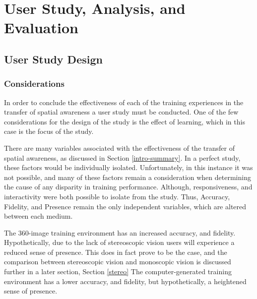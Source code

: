 \documentclass[ %
                    author={Elis Jones},
                supervisor={Dr. Kirsten Cater},
                    degree={BSc},
                     title={The Effect of Presentation Medium on Spatial Cognition},
                  subtitle={in the Virtual Environment},
                      year={2018} ]{dissertation}
\begin{document}
\chapter{User Study, Analysis, and Evaluation}\label{user-study-chapter}

\section{User Study Design}

\subsection{Considerations}
In order to conclude the effectiveness of each of the training experiences in the transfer of spatial awareness a user study must be conducted. One of the few considerations for the design of the study is the effect of learning, which in this case is the focus of the study.

There are many variables associated with the effectiveness of the transfer of spatial awareness, as discussed in Section \ref{intro-summary}. In a perfect study, these factors would be individually isolated. Unfortunately, in this instance it was not possible, and many of these factors remain a consideration when determining the cause of any disparity in training performance. Although, responsiveness, and interactivity were both possible to isolate from the study. Thus, Accuracy, Fidelity, and Presence remain the only independent variables, which are altered between each medium. 

The 360-image training environment has an increased accuracy, and fidelity. Hypothetically, due to the lack of stereoscopic vision users will experience a reduced sense of presence. This does in fact prove to be the case, and the comparison between stereoscopic vision and monoscopic vision is discussed further in a later section, Section \ref{stereo}
The computer-generated training environment has a lower accuracy, and fidelity, but hypothetically, a heightened sense of presence. 
\end{document}
